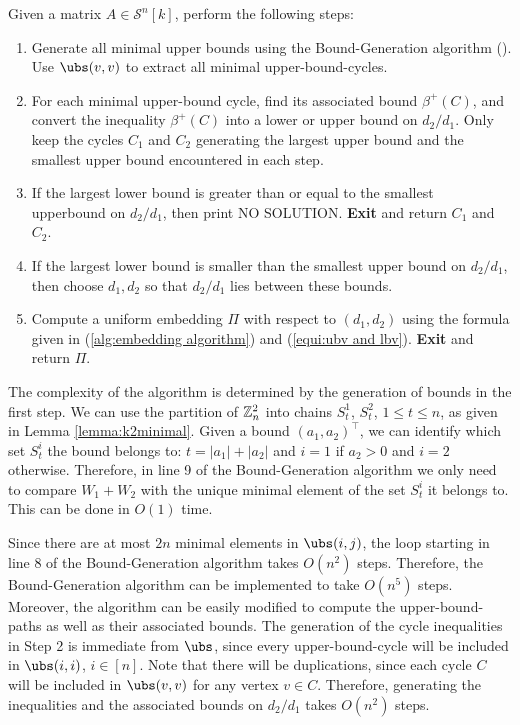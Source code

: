 \documentclass[runningheads]{llncs}
\begin{document}
Given a matrix $A\in\mathcal{S}^n[k]$, perform the following steps:
\begin{enumerate}
    \item Generate all minimal upper bounds using the Bound-Generation algorithm (). Use $\ubs(v,v)$ to extract all minimal upper-bound-cycles.
    \item For each minimal upper-bound cycle, find its associated bound $\beta^+(C)$, and convert the inequality $\beta^+(C)$ into a lower or upper bound on $d_2/d_1$. Only keep the cycles $C_1$ and $C_2$ generating the largest upper bound and the smallest upper bound encountered in each step.
    \item If the largest lower bound is greater than or equal to the smallest upperbound on $d_2/d_1$, then print NO SOLUTION.  {\bf Exit} and return $C_1$ and $C_2$.
    \item If the largest lower bound is smaller than the smallest upper bound on $d_2/d_1$, then choose $d_1,d_2$ so that $d_2/d_1$ lies between these bounds.
    \item Compute a uniform embedding $\Pi$ with respect to $(d_1,d_2)$ using the formula given in (\ref{alg:embedding algorithm}) and (\ref{equi:ubv and lbv}). {\bf Exit} and return $\Pi$.
\end{enumerate}

The complexity of the algorithm is determined by the generation of bounds in the first step. We can use the partition of $\mathbb Z^2_n$ into chains $S^1_t$, $S^2_t$, $1\leq t\leq n$, as given in Lemma \ref{lemma:k2minimal}. Given a bound $(a_1,a_2)^\top$, we can identify which set $S^i_t$ the bound belongs to: $t=|a_1|+|a_2|$ and $i=1$  if $a_2>0$ and $i=2$ otherwise. Therefore, in line 9 of the Bound-Generation algorithm we only need to compare $W_1+W_2$ with the unique minimal element of the set $S^i_t$ it belongs to. This can be done in $O(1)$ time.

Since there are at most $2n$ minimal elements in $\ubs(i,j)$, the loop starting in line 8 of the Bound-Generation algorithm takes $O(n^2)$ steps. Therefore, the  Bound-Generation algorithm can be implemented to take $O(n^5)$ steps. Moreover, the algorithm can be easily modified to compute the upper-bound-paths as well as their associated bounds.   
The generation of the cycle inequalities in Step 2 is immediate from $\ubs$, since every upper-bound-cycle will be included in $\ubs(i,i)$, $i\in [n]$. Note that there will be duplications, since each cycle $C$ will be included in $\ubs (v,v)$ for any vertex $v\in C$. Therefore, generating the inequalities and the associated bounds on $d_2/d_1$ takes $O(n^2)$ steps.
\end{document}
